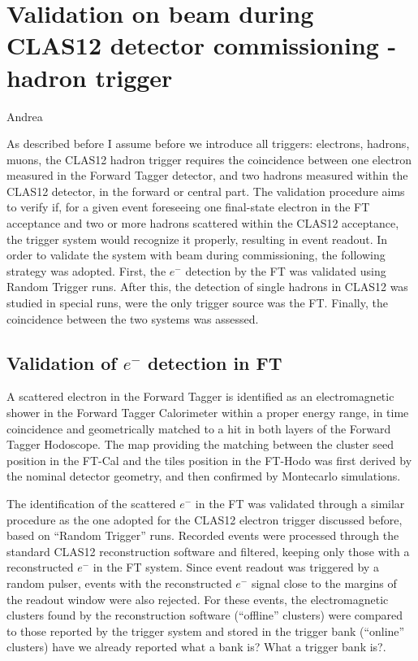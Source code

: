 \section{Validation on beam during CLAS12 detector commissioning -  hadron trigger} Andrea

As described before {\color{Red} I assume before we introduce all triggers: electrons, hadrons, muons}, the CLAS12 hadron trigger requires the coincidence between one electron measured in the Forward Tagger detector, and two hadrons measured within the CLAS12 detector, in the forward or central part. The validation procedure aims to verify if, for a given event foreseeing one final-state electron in the FT acceptance and two or more hadrons scattered within the CLAS12 acceptance, the trigger system would recognize it properly, resulting in event readout. In order to validate the system with beam during commissioning, the following strategy was adopted. First, the $e^-$ detection by the FT was validated using Random Trigger runs. After this, the detection of single hadrons in CLAS12 was studied in special runs, were the only trigger source was the FT. Finally, the coincidence between the two systems was assessed.

\subsection{Validation of $e^-$ detection in FT}

A scattered electron in the Forward Tagger is identified as an electromagnetic shower in the Forward Tagger Calorimeter within a proper energy range, in time coincidence and geometrically matched to a hit in both layers of the Forward Tagger Hodoscope. The map providing the matching between the cluster seed position in the FT-Cal and the tiles position in the FT-Hodo was first derived by the nominal detector geometry, and then confirmed by Montecarlo simulations.

The identification of the scattered $e^-$ in the FT was validated through a similar procedure as the one adopted for the CLAS12 electron trigger discussed before, based on ``Random Trigger'' runs. Recorded events were processed through the standard CLAS12 reconstruction software and filtered, keeping only those with a reconstructed $e^-$ in the FT system. Since event readout was triggered by a random pulser, events with the reconstructed $e^-$ signal close to the margins of the readout window were also rejected.
For these events, the electromagnetic clusters found by the reconstruction software (``offline'' clusters) were compared to those reported by the trigger system and stored in the trigger bank (``online'' clusters) {\color{red} have we already reported what a bank is? What a trigger bank is?}. 

